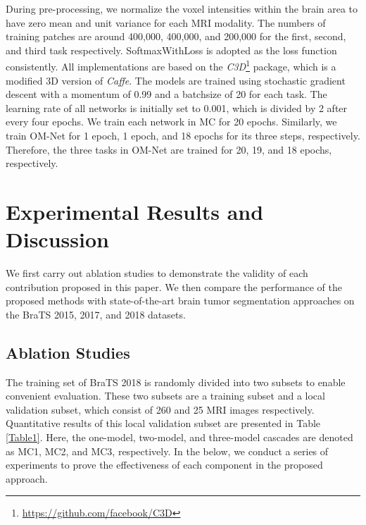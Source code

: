 \documentclass[journal,twoside]{IEEEtran}
\begin{document}
During pre-processing, we normalize the voxel intensities within the brain area to have zero mean and unit variance for each MRI modality. The numbers of training patches are around 400,000, 400,000, and 200,000 for the first, second, and third task respectively. SoftmaxWithLoss is adopted as the loss function consistently. All implementations are based on the \emph{C3D}\footnote[1]{\url{https://github.com/facebook/C3D}} \cite{tran2015learning,karpathy2014large,jia2014caffe} package, which is a modified 3D version of \emph{Caffe}\cite{jia2014caffe}. The models are trained using stochastic gradient descent with a momentum of 0.99 and a batchsize of 20 for each task. The learning rate of all networks is initially set to 0.001, which is divided by 2 after every four epochs. We train each network in MC for 20 epochs. Similarly, we train OM-Net for 1 epoch, 1 epoch, and 18 epochs for its three steps, respectively. Therefore, the three tasks in OM-Net are trained for 20, 19, and 18 epochs, respectively.




\section{Experimental Results and Discussion}
We first carry out ablation studies to demonstrate the validity of each contribution proposed in this paper. We then compare the performance of the proposed methods with state-of-the-art brain tumor segmentation approaches on the BraTS 2015, 2017, and 2018 datasets. 





\subsection{Ablation Studies}
The training set of BraTS 2018 is randomly divided into two subsets to enable convenient evaluation. These two subsets are a training subset and a local validation subset, which consist of 260 and 25 MRI images respectively. Quantitative results of this local validation subset are presented in Table \ref{Table1}. Here, the one-model, two-model, and three-model cascades are denoted as MC1, MC2, and MC3, respectively. In the below, we conduct a series of experiments to prove the effectiveness of each component in the proposed approach.



\newlength\savedwidth
\newcommand\whline{\noalign{\global\savedwidth\arrayrulewidth
		\global\arrayrulewidth 3pt}
	\hline
	\noalign{\global\arrayrulewidth\savedwidth}}
\newlength\savewidth
\newcommand\shline{\noalign{\global\savewidth\arrayrulewidth
		\global\arrayrulewidth 0.9pt}	
	\hline
	\noalign{\global\arrayrulewidth\savewidth}}	
\end{document}

